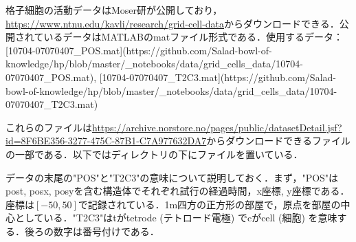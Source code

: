 格子細胞の活動データはMoser研が公開しており，\url{https://www.ntnu.edu/kavli/research/grid-cell-data}からダウンロードできる．公開されているデータはMATLABのmatファイル形式である．使用するデータ：[10704-07070407_POS.mat](https://github.com/Salad-bowl-of-knowledge/hp/blob/master/_notebooks/data/grid_cells_data/10704-07070407_POS.mat), [10704-07070407_T2C3.mat](https://github.com/Salad-bowl-of-knowledge/hp/blob/master/_notebooks/data/grid_cells_data/10704-07070407_T2C3.mat)

これらのファイルは\url{https://archive.norstore.no/pages/public/datasetDetail.jsf?id=8F6BE356-3277-475C-87B1-C7A977632DA7}からダウンロードできるファイルの一部である．以下ではディレクトリの下にファイルを置いている．

データの末尾の"POS"と"T2C3"の意味について説明しておく．まず，"POS"はpost, posx, posyを含む構造体でそれぞれ試行の経過時間，x座標, y座標である．座標は$[-50, 50]$で記録されている．1m四方の正方形の部屋で，原点を部屋の中心としている．"T2C3"はtがtetrode (テトロード電極) でcがcell (細胞) を意味する．後ろの数字は番号付けである． 
